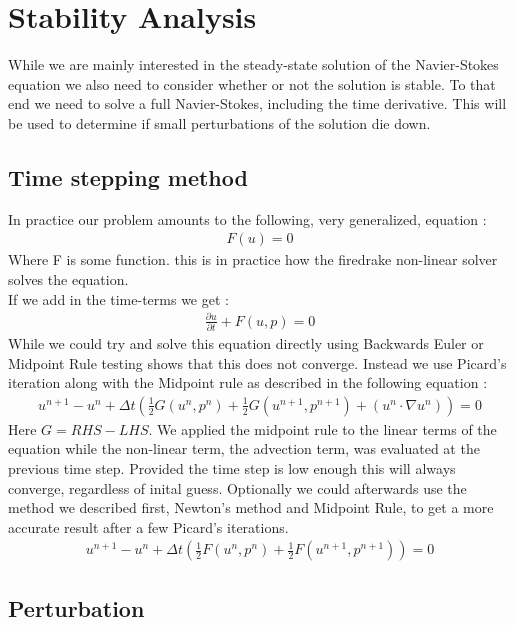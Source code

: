 \documentclass[11pt,twoside,a4paper]{article}
\begin{document}
\section{Stability Analysis}

While we are mainly interested in the steady-state solution of the Navier-Stokes equation we also need to consider whether or not the solution is stable. To that end we need to solve a full Navier-Stokes, including the time derivative. This will be used to determine if small perturbations of the solution die down.
\subsection{Time stepping method}
In practice our problem amounts to the following, very generalized, equation :
\begin{align}
F(u) = 0
\end{align}
Where F is some function. this is in practice how the firedrake non-linear solver solves the equation.\\
If we add in the time-terms we get :
\begin{align}
\frac{\partial u}{\partial t} + F(u,p) = 0
\end{align}
While we could try and solve this equation directly using Backwards Euler or Midpoint Rule testing shows that this does not converge. Instead we use Picard's iteration along with the Midpoint rule as described in the following equation :
\begin{align}
u^{n+1} - u^n + \Delta t (\frac{1}{2}G(u^n,p^n) + \frac{1}{2} G(u^{n+1},p^{n+1}) + ( u^n \cdot \nabla u^n) ) = 0
\end{align}
Here $G = RHS - LHS $. We applied the midpoint rule to the linear terms of the equation while the non-linear term, the advection term, was evaluated at the previous time step. Provided the time step is low enough this will always converge, regardless of inital guess.
Optionally we could afterwards use the method we described first, Newton's method and Midpoint Rule, to get a more accurate result after a few Picard's iterations.
\begin{align}
u^{n+1} - u^n + \Delta t (\frac{1}{2}F(u^n,p^n) + \frac{1}{2} F(u^{n+1},p^{n+1})) = 0
\end{align}

\subsection{Perturbation}
\end{document}
